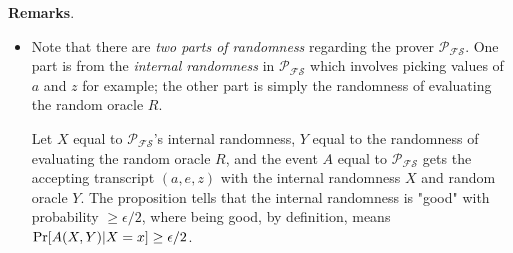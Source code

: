 \documentclass{article}
\begin{document}
\textbf{Remarks}.
\begin{itemize}
\item Note that there are \textit{two parts of randomness} regarding the prover $\mathcal{P_{FS}}$. One part is from the \textit{internal randomness} in $\mathcal{P_{FS}}$ which involves picking values of $a$ and $z$ for example; the other part is simply the randomness of evaluating the random oracle $R$. 

Let $X$ equal to $\mathcal{P_{FS}}$'s internal randomness, $Y$ equal to the randomness of evaluating the random oracle $R$, and the event $A$ equal to $\mathcal{P_{FS}}$ gets the accepting transcript $(a, e, z)$ with the internal randomness $X$ and random oracle $Y$. The proposition tells that the internal randomness is "good" with probability $\geq \epsilon/2$, where being good, by definition, means $\operatorname{Pr}[A(X, Y) \vert X = x] \geq \epsilon/2$. 


\end{itemize}
\end{document}
